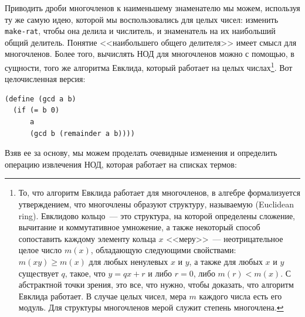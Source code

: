 Приводить дроби многочленов к наименьшему знаменателю мы
можем, используя ту же самую идею, которой мы воспользовались для
целых чисел: изменить {\tt make-rat}, чтобы она делила и числитель, и
знаменатель на их наибольший общий делитель.  Понятие  <<наибольшего
общего делителя>> имеет смысл для многочленов.  Более того, вычислять
НОД для многочленов можно с помощью, в сущности, того же алгоритма
Евклида, который работает на целых числах\footnote{То, что алгоритм Евклида 
работает для многочленов,
в алгебре формализуется утверждением, что многочлены образуют
структуру, называемую 
 (Euclidean ring).
Евклидово кольцо~---  это структура, на которой определены сложение,
вычитание и коммутативное умножение, а также некоторый способ
сопоставить каждому элементу кольца $x$ 
<<меру>>~---
неотрицательное целое число $m(x)$, обладающую
следующими свойствами: $m(xy) \ge m(x)$ для
любых ненулевых $x$ и $y$,
а также для любых $x$ и $y$
существует $q$, такое, что
$y = qx + r$ и либо $r=0$,
либо $m(r) < m(x)$.  С абстрактной точки
зрения, это все, что нужно, чтобы доказать, что алгоритм Евклида
работает.  В случае целых чисел, мера $m$ каждого
числа есть его модуль.  Для структуры многочленов мерой служит
степень многочлена.}.
Вот целочисленная версия:

\begin{Verbatim}[fontsize=\small]
(define (gcd a b)
  (if (= b 0)
      a
      (gcd b (remainder a b))))
\end{Verbatim}
Взяв ее за основу, мы можем проделать очевидные изменения и определить
операцию извлечения НОД, которая работает на списках термов:

